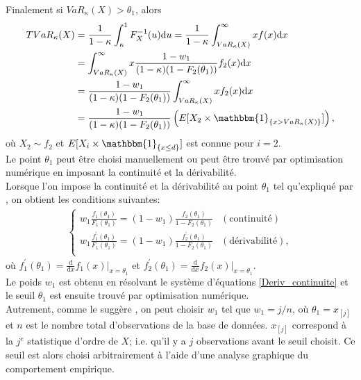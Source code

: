 	Finalement si $ VaR_{\kappa}(X) > \theta_1$, alors
	\begin{align*}
		TVaR_{\kappa}(X) &= \frac{1}{1-\kappa} \int_{\kappa}^{1} F_X^{-1}(u) \textrm{d}u = \frac{1}{1-\kappa} \int_{VaR_{\kappa}(X)}^{\infty} x f(x) \textrm{d}x\\
		&=  \int_{VaR_{\kappa}(X)}^{\infty} x  \frac{1-w_1}{(1-\kappa)(1-F_2(\theta_1))} f_2(x) \textrm{d}x\\
		&=  \frac{1-w_1}{(1-\kappa)(1-F_2(\theta_1))} \int_{VaR_{\kappa}(X)}^{\infty} x   f_2(x) \textrm{d}x\\
		&= \frac{1-w_1}{(1-\kappa)(1-F_2(\theta_1))} \left( E[X_2 \times \mathbbm{1}_{\left\{ x > VaR_{\kappa}(X) \right\}}]\right), \\
	\end{align*}	
	où $X_2\sim f_2$ et $E[X_i \times \mathbbm{1}_{\left\{ x \leq d \right\}} ]$ est connue pour $i=2$.\\
	Le point $\theta_1$ peut être choisi manuellement ou peut être trouvé par optimisation numérique en imposant la continuité et la dérivabilité.\\
	
	Lorsque l'on impose la continuité et la dérivabilité au point $\theta_1$ tel qu'expliqué par \cite{brazauskas2016modeling}, on obtient les conditions suivantes:
	\begin{align}\label{Deriv_continuite}
		\left\{
		\begin{array}{ll}
			w_1 \frac{f_1(\theta_1)}{F_1(\theta_1)} = (1-w_1) \frac{f_2(\theta_1)}{1-F_2(\theta_1)} & (\textrm{continuité}) \\
			w_1 \frac{f_1^{'}(\theta_1)}{F_1(\theta_1)} = (1-w_1) \frac{f_2^{'}(\theta_1)}{1-F_2(\theta_1)} & (\textrm{dérivabilité}), \\
		\end{array}
		\right.
	\end{align}
	où $f_1^{'}(\theta_1) =  \frac{\textrm{d}}{\textrm{d}x} f_1(x) \Big|_{x=\theta_1}$ et $f_2^{'}(\theta_1) =  \frac{\textrm{d}}{\textrm{d}x} f_2(x) \Big|_{x=\theta_1}$.\\
	
	Le poids $w_1$ est obtenu en résolvant le système d'équations \ref{Deriv_continuite} et le seuil $\theta_1$ est ensuite trouvé par optimisation numérique.\\
	
	Autrement, comme le suggère \cite{albrecher2017reinsurance}, on peut choisir $w_1$ tel que $w_1 = j/n$, où $\theta_1 = x_{[j]}$ et $n$ est le nombre total d'observations de la base de données. $x_{[j]}$ correspond à la $j^e$ statistique d'ordre de $X$; i.e. qu'il y a $j$ observations avant le seuil choisit. Ce seuil est alors choisi arbitrairement à l'aide d'une analyse graphique du comportement empirique.
	
